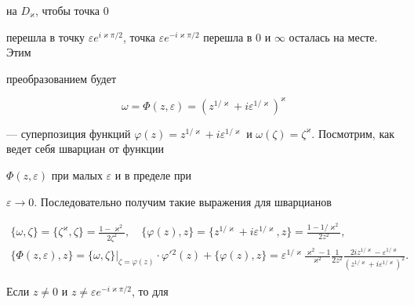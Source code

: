 на $D_{\varkappa} $, чтобы точка 0 


перешла в точку $\varepsilon e^{i\varkappa \pi /2}$, точка $\varepsilon 


e^{- i\varkappa \pi /2}$ перешла в 0 и $\infty$ осталась на месте. Этим 


преобразованием будет 


\begin{equation}


\omega=\Phi ({z,\varepsilon} )=({z^{1/\varkappa}+


i\varepsilon^{1/\varkappa}})^{\varkappa} 


\end{equation}


--- суперпозиция функций $\varphi (z)=z^{1/\varkappa}+


i\varepsilon^{1/\varkappa}$  и  $\omega ({\zeta} )=\zeta 


^{\varkappa}$. Посмотрим, как ведет себя шварциан от функции 


$\Phi({z,\varepsilon} )$ при малых $\varepsilon $ и в пределе при 


$\varepsilon \to 0$. Последовательно получим такие выражения для шварцианов


\begin{gather*}


\{\omega,\zeta \} =


\{\zeta^{\varkappa},\zeta \} =


\frac{{1-\varkappa^2}}{{2\zeta^2}},\quad


\{\varphi (z),z\} =


\{z^{1/\varkappa}+i\varepsilon^{1/\varkappa},z\} =


\frac{{1-1/\varkappa^2}}{{2z^2}}, \\


%


\{\Phi ({z,\varepsilon} ),z\} =


\{\omega,\zeta \} |_{\zeta=\varphi (z)} 


\cdot {\varphi}'{}^2(z)+\{\varphi (z),z\} =


\varepsilon^{1/\varkappa} \frac{{\varkappa^2-1}}{{\varkappa 


^2}}\frac{1}{{2z^2}}\frac{{2iz^{1/\varkappa}-\varepsilon^{1/\varkappa 


}}}{{({z^{1/\varkappa}+i\varepsilon^{1/\varkappa}})^2}}.


\end{gather*}


Если $z \ne 0$ и $z \ne \varepsilon e^{- i\varkappa \pi /2}$, то для 


